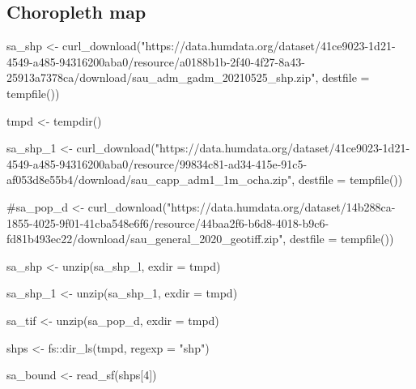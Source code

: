 \documentclass[
  letterpaper,
  DIV=11,
  numbers=noendperiod]{scrreprt}
\newenvironment{Shaded}{\begin{snugshade}}{\end{snugshade}}
\newcommand{\AttributeTok}[1]{\textcolor[rgb]{0.40,0.45,0.13}{#1}}
\newcommand{\CommentTok}[1]{\textcolor[rgb]{0.37,0.37,0.37}{#1}}
\newcommand{\DecValTok}[1]{\textcolor[rgb]{0.68,0.00,0.00}{#1}}
\newcommand{\FunctionTok}[1]{\textcolor[rgb]{0.28,0.35,0.67}{#1}}
\newcommand{\NormalTok}[1]{\textcolor[rgb]{0.00,0.23,0.31}{#1}}
\newcommand{\OtherTok}[1]{\textcolor[rgb]{0.00,0.23,0.31}{#1}}
\newcommand{\SpecialCharTok}[1]{\textcolor[rgb]{0.37,0.37,0.37}{#1}}
\newcommand{\StringTok}[1]{\textcolor[rgb]{0.13,0.47,0.30}{#1}}
\begin{document}
\subsection{Choropleth map}\label{choropleth-map}

\begin{Shaded}
\begin{Highlighting}[]
\NormalTok{sa\_shp }\OtherTok{\textless{}{-}} \FunctionTok{curl\_download}\NormalTok{(}\StringTok{"https://data.humdata.org/dataset/41ce9023{-}1d21{-}4549{-}a485{-}94316200aba0/resource/a0188b1b{-}2f40{-}4f27{-}8a43{-}25913a7378ca/download/sau\_adm\_gadm\_20210525\_shp.zip"}\NormalTok{, }\AttributeTok{destfile =} \FunctionTok{tempfile}\NormalTok{())}

\NormalTok{tmpd }\OtherTok{\textless{}{-}} \FunctionTok{tempdir}\NormalTok{()}

\NormalTok{sa\_shp\_1 }\OtherTok{\textless{}{-}} \FunctionTok{curl\_download}\NormalTok{(}\StringTok{"https://data.humdata.org/dataset/41ce9023{-}1d21{-}4549{-}a485{-}94316200aba0/resource/99834c81{-}ad34{-}415e{-}91c5{-}af053d8e55b4/download/sau\_capp\_adm1\_1m\_ocha.zip"}\NormalTok{, }\AttributeTok{destfile =} \FunctionTok{tempfile}\NormalTok{())}

\CommentTok{\#sa\_pop\_d \textless{}{-} curl\_download("https://data.humdata.org/dataset/14b288ca{-}1855{-}4025{-}9f01{-}41cba548e6f6/resource/44baa2f6{-}b6d8{-}4018{-}b9c6{-}fd81b493ec22/download/sau\_general\_2020\_geotiff.zip", destfile = tempfile())}

\NormalTok{sa\_shp }\OtherTok{\textless{}{-}} \FunctionTok{unzip}\NormalTok{(sa\_shp\_l, }\AttributeTok{exdir =}\NormalTok{ tmpd)}

\NormalTok{sa\_shp\_1 }\OtherTok{\textless{}{-}} \FunctionTok{unzip}\NormalTok{(sa\_shp\_1, }\AttributeTok{exdir =}\NormalTok{ tmpd)}

\NormalTok{sa\_tif }\OtherTok{\textless{}{-}} \FunctionTok{unzip}\NormalTok{(sa\_pop\_d, }\AttributeTok{exdir =}\NormalTok{ tmpd)}

\NormalTok{shps }\OtherTok{\textless{}{-}}\NormalTok{ fs}\SpecialCharTok{::}\FunctionTok{dir\_ls}\NormalTok{(tmpd, }\AttributeTok{regexp =} \StringTok{"shp"}\NormalTok{)}

\NormalTok{sa\_bound }\OtherTok{\textless{}{-}} \FunctionTok{read\_sf}\NormalTok{(shps[}\DecValTok{4}\NormalTok{]) }


\end{Highlighting}
\end{Shaded}
\end{document}
